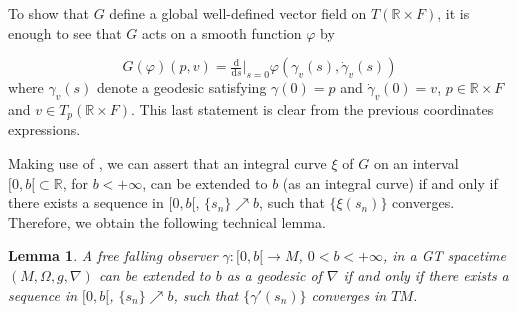 \documentclass[12pt]{article}
\newcommand{\diff}{\mathrm{d}}
\newcommand{\ds}{\diff s}
\newcommand{\spacetime}{(M,\Omega,g,\nabla)}
\newtheorem{lem}[defi]{Lemma}
\def\R{\mathbb R}
\begin{document}
To show that $G$ define a global well-defined vector field on $T(\R\times F)$, it is enough to see that $G$ acts on a smooth function $\varphi$ by

$$G(\varphi)(p,v)=\tfrac{\diff}{\ds}{\big|_{s=0}} \varphi(\gamma_v(s),\dot{\gamma}_v(s))$$
\noindent where $\gamma_v(s)$ denote a geodesic satisfying $\gamma(0)=p$ and $\dot{\gamma}_v(0)=v$, $p\in \R\times F$ and $v\in T_p(\R\times F)$. This last statement is clear from the previous coordinates expressions.


Making use of \cite[Lem. 1.56]{ONeill1983}, we can assert that an integral curve $\xi$ of $G$ on an interval $[0,b[\subset \R$, for $b<+\infty$, can be extended to $b$ (as an integral curve) if and only if there exists a sequence in $[0,b[$, $\{s_n\}\nearrow b$, such that $\{\xi(s_n)\}$ converges.
Therefore, we obtain the following technical lemma. 
\begin{lem}\label{lem:extensibility}
    A free falling observer $\gamma\colon [0,b[ \to M$, $0<b<+\infty$, in a GT spacetime $\spacetime$ can be extended to $b$ as a geodesic of $\nabla$ if and only if there exists a sequence in $[0,b[$, $\{s_n\}\nearrow b$, such that $\{\gamma'(s_n)\}$ converges in $TM$.
\end{lem}
\end{document}

